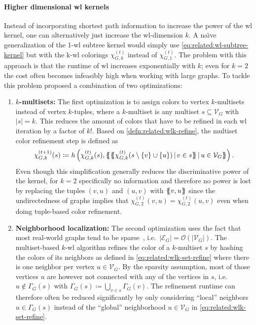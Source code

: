 \paragraph{Higher dimensional \ac{wl} kernels}
Instead of incorporating shortest path information to increase the power of the \ac{wl} kernel, one can alternatively just increase the \acs{wl}-dimension $k$.
A na{\"\i}ve generalization of the 1-\acs{wl} subtree kernel would simply use \cref{eq:related:wl-subtree-kernel} but with the k-\acs{wl} colorings $\chi_{G,k}^{(t)}$ instead of $\chi_{G,1}^{(t)}$.
The problem with this approach is that the runtime of \ac{wl} increases exponentially with $k$;
even for $k = 2$ the cost often becomes infeasibly high when working with large graphs.
To tackle this problem \citet{Morris2017} proposed a combination of two optimizations:
\begin{enumerate}[label=\textbf{\arabic*.}]
	\item \textbf{$k$-multisets:}
		The first optimization is to assign colors to vertex $k$-multisets instead of vertex $k$-tuples, where a $k$-multiset is any multiset $s \subseteq \mathcal{V}_G$ with ${|s|} = k$.
		This reduces the amount of colors that have to be refined in each \ac{wl} iteration by a factor of $k!$. %
		Based on \cref{defn:related:wlk-refine}, the multiset color refinement step is defined as
		\begin{align}
			\chi_{G,k}^{(t+1)}(s) \coloneqq h\left(\chi_{G,k}^{(t)}(s), \ldblbrace \ldblbrace \chi_{G,k}^{(t)}(s \setminus \{v\} \cup \{u\})\, |\, v \in s \rdblbrace\, |\, u \in \mathcal{V}_G \rdblbrace\right) \text{.} \label{eq:related:wlk-set-refine} %
		\end{align}
		Even though this simplification generally reduces the discriminative power of the kernel, for $k = 2$ specifically no information and therefore no power is lost by replacing the tuples $(v, u)$ and $(u, v)$ with $\ldblbrace v, u \rdblbrace$ since the undirectedness of graphs implies that $\chi_{G,2}^{(t)}(v, u) = \chi_{G,2}^{(t)}(u, v)$ even when doing tuple-based color refinement.
	\item \textbf{Neighborhood localization:}
		The second optimization uses the fact that most real-world graphs tend to be sparse~\cite{Chung2010}, i.e.\ ${|\mathcal{E}_G|} = \mathcal{O}(|\mathcal{V}_G|)$.
		The multiset-based $k$-\acs{wl} algorithm refines the color of a $k$-multiset $s$ by hashing the colors of its neighbors as defined in \cref{eq:related:wlk-set-refine} where there is one neighbor per vertex $u \in \mathcal{V}_G$.
		By the sparsity assumption, most of those vertices $u$ are however not connected with any of the vertices in $s$, i.e.\ $u \notin \Gamma_G(s)$ with $\Gamma_G(s) \coloneqq \bigcup_{v \in s} \Gamma_G(v)$.
		The refinement runtime can therefore often be reduced significantly by only considering ``local'' neighbors $u \in \Gamma_G(s)$ instead of the ``global'' neighborhood $u \in \mathcal{V}_G$ in \cref{eq:related:wlk-set-refine}.
\end{enumerate}
